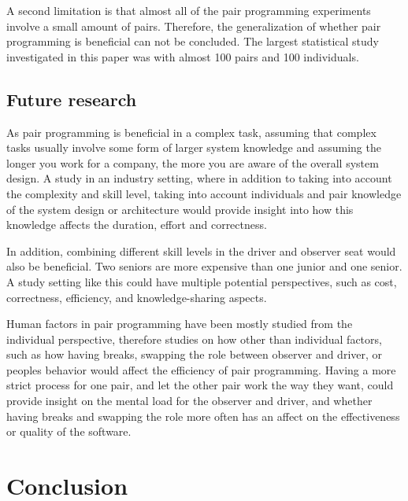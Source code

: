 \documentclass[conference]{IEEEtran}
\begin{document}
A second limitation is that almost all of the pair programming experiments involve a small amount of pairs. Therefore, the generalization of whether pair programming is beneficial can not be concluded. The largest statistical study investigated in this paper was \cite{Arisholm2007Evaluating} with almost 100 pairs and 100 individuals.


\subsection{Future research}

As pair programming is beneficial in a complex task, assuming that complex tasks usually involve some form of larger system knowledge and assuming the longer you work for a company, the more you are aware of the overall system design. A study in an industry setting, where in addition to taking into account the complexity and skill level, taking into account individuals and pair knowledge of the system design or architecture would provide insight into how this knowledge affects the duration, effort and correctness.

In addition, combining different skill levels in the driver and observer seat would also be beneficial. Two seniors are more expensive than one junior and one senior. A study setting like this could have multiple potential perspectives, such as cost, correctness, efficiency, and knowledge-sharing aspects.

Human factors in pair programming have been mostly studied from the individual perspective, therefore studies on how other than individual factors, such as how having breaks, swapping the role between observer and driver, or peoples behavior would affect the efficiency of pair programming. Having a more strict process for one pair, and let the other pair work the way they want, could provide insight on the mental load for the observer and driver, and whether having breaks and swapping the role more often has an affect on the effectiveness or quality of the software.

\section{Conclusion}
\end{document}
